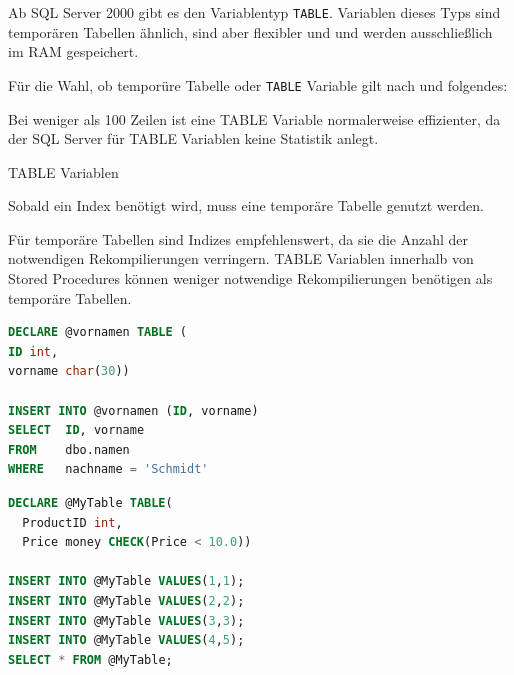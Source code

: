 \documentclass[12pt,ngerman,a4paper,index=totoc,twoside]{scrartcl}
\newcommand{\sql}[1]{\texttt{#1}}
\newcommand{\lwidth}{0.75}
\begin{document}
Ab SQL Server 2000 gibt es den Variablentyp \sql{TABLE}.  Variablen dieses Typs sind temporären Tabellen ähnlich, sind aber flexibler und und werden ausschließlich im RAM gespeichert. 

Für die Wahl, ob temporüre Tabelle oder \sql{TABLE} Variable gilt nach \cite{sqlteam:temptables} und \cite{odetocode:table} folgendes:

\begin{compactitem}
 \item Bei weniger als 100 Zeilen ist eine TABLE Variable normalerweise effizienter, da der SQL Server für TABLE Variablen keine Statistik anlegt.
 \item TABLE Variablen 
 \item Sobald ein Index benötigt wird, muss eine temporäre Tabelle genutzt werden.
 \item Für temporäre Tabellen sind Indizes empfehlenswert, da sie die Anzahl der notwendigen Rekompilierungen verringern. TABLE Variablen innerhalb von Stored Procedures können weniger notwendige Rekompilierungen benötigen als temporäre Tabellen.
\end{compactitem}

\begin{center}
\begin{minipage}{\lwidth\textwidth}
\begin{lstlisting}[language={SQL},caption={Nutzung einer \sql{TABLE} Variablen},label={temptabellen:table1}]
DECLARE @vornamen TABLE (
ID int,
vorname char(30))

INSERT INTO @vornamen (ID, vorname)
SELECT 	ID, vorname
FROM 	dbo.namen
WHERE 	nachname = 'Schmidt'
\end{lstlisting}
\end{minipage}
\end{center}

\begin{center}
\begin{minipage}{\lwidth\textwidth}
\begin{lstlisting}[language={SQL},caption={Nutzung einer \sql{TABLE} Variablen},label={temptabellen:table2}]
DECLARE @MyTable TABLE(
  ProductID int,
  Price money CHECK(Price < 10.0))

INSERT INTO @MyTable VALUES(1,1);
INSERT INTO @MyTable VALUES(2,2);
INSERT INTO @MyTable VALUES(3,3);
INSERT INTO @MyTable VALUES(4,5);
SELECT * FROM @MyTable; 
\end{lstlisting}
\end{minipage}
\end{center}
\end{document}
